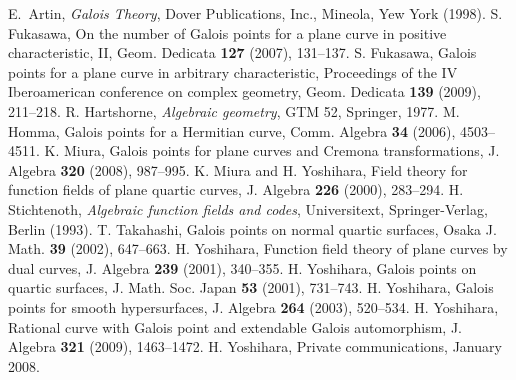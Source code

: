 \documentclass[10pt,oneside]{amsart}
\theoremstyle{definition}
\begin{document}
\begin{thebibliography}{99} 
 E.~Artin, {\it Galois Theory}, Dover Publications, Inc., Mineola, Yew York (1998). 
 S. Fukasawa, On the number of Galois points for a plane curve in positive characteristic, II, Geom. Dedicata {\bf 127} (2007), 131--137.
 S. Fukasawa, Galois points for a plane curve in arbitrary characteristic, Proceedings of the IV Iberoamerican conference on complex geometry, Geom. Dedicata {\bf 139} (2009), 211--218. 
 R. Hartshorne, {\it Algebraic geometry}, GTM 52, Springer, 1977. 
 M. Homma, Galois points for a Hermitian curve, Comm. Algebra {\bf 34} (2006), 4503--4511. 
 K. Miura, Galois points for plane curves and Cremona transformations, J. Algebra {\bf 320} (2008), 987--995. 
 K. Miura and H. Yoshihara, Field theory for function fields of plane quartic curves, J. Algebra {\bf 226} (2000), 283--294. 
 H. Stichtenoth, {\it Algebraic function fields and codes}, Universitext, Springer-Verlag, Berlin (1993). 
 T. Takahashi, Galois points on normal quartic surfaces, Osaka J. Math. {\bf 39} (2002), 647--663. 
 H. Yoshihara, Function field theory of plane curves by dual curves, J. Algebra {\bf 239} (2001), 340--355. 
 H. Yoshihara, Galois points on quartic surfaces, J. Math. Soc. Japan {\bf 53} (2001), 731--743. 
 H. Yoshihara, Galois points for smooth hypersurfaces, J. Algebra {\bf 264} (2003), 520--534.  
 H. Yoshihara, Rational curve with Galois point and extendable Galois automorphism, J. Algebra {\bf 321} (2009), 1463--1472. 
 H. Yoshihara, Private communications, January 2008. 
\end{thebibliography}
\end{document}
